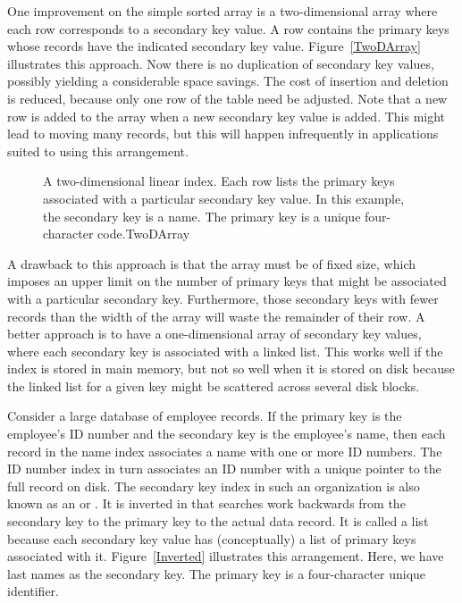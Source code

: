 One improvement on the simple sorted array is a two-dimensional
array where each row corresponds to a secondary key value.
A row contains the primary keys whose records have the indicated
secondary key value.
Figure~\ref{TwoDArray} illustrates this approach.
Now there is no duplication of secondary key values,
possibly yielding a considerable space savings.
The cost of insertion and deletion is reduced, because only one row
of the table need be adjusted.
Note that a new row is added to the array when a new secondary key
value is added.
This might lead to moving many records, but this will happen
infrequently in applications suited to using this arrangement.

\begin{figure}
\vspace{-\bigskipamount}

{A two-dimensional linear index.
Each row lists the primary keys associated with a particular
secondary key value.
In this example, the secondary key is a name.
The primary key is a unique four-character code.}{TwoDArray}
\bigskip
\end{figure}

A drawback to this approach is that the array must be of fixed
size, which imposes an upper limit on the number of primary keys
that might be associated with a particular secondary key.
Furthermore, those secondary keys with fewer records than the width
of the array will waste the remainder of their row.
A better approach is to have a one-dimensional array of secondary key
values, where each secondary key is associated with a linked
list.
This works well if the index is stored in main memory, but not so
well when it is stored on disk because the linked list for a given key
might be scattered across several disk blocks.

Consider a large database of employee records.
If the primary key is the employee's ID number and the secondary key
is the employee's name, then each record in the name index associates a
name with one or more ID numbers.
The ID number index in turn associates an ID number with a unique
pointer to the full record on disk.
The secondary key index in such an organization is also known as an
 or
.
It is inverted in that searches work backwards from the
secondary key to the primary key to the actual data record.
It is called a list because each secondary key value
has (conceptually) a list of primary keys associated with it.
Figure~\ref{Inverted} illustrates this arrangement.
Here, we have last names as the secondary key.
The primary key is a four-character unique identifier.

